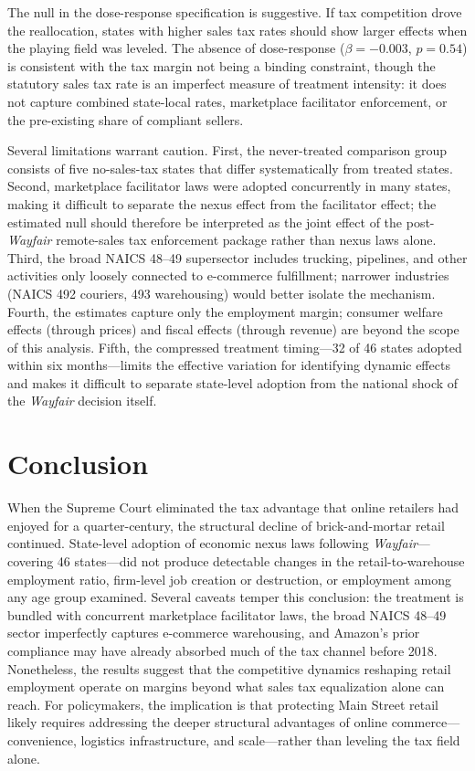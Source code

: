 \documentclass[12pt]{article}
\begin{document}
The null in the dose-response specification is suggestive. If tax competition drove the reallocation, states with higher sales tax rates should show larger effects when the playing field was leveled. The absence of dose-response ($\beta = -0.003$, $p = 0.54$) is consistent with the tax margin not being a binding constraint, though the statutory sales tax rate is an imperfect measure of treatment intensity: it does not capture combined state-local rates, marketplace facilitator enforcement, or the pre-existing share of compliant sellers.

Several limitations warrant caution. First, the never-treated comparison group consists of five no-sales-tax states that differ systematically from treated states. Second, marketplace facilitator laws were adopted concurrently in many states, making it difficult to separate the nexus effect from the facilitator effect; the estimated null should therefore be interpreted as the joint effect of the post-\textit{Wayfair} remote-sales tax enforcement package rather than nexus laws alone. Third, the broad NAICS 48--49 supersector includes trucking, pipelines, and other activities only loosely connected to e-commerce fulfillment; narrower industries (NAICS 492 couriers, 493 warehousing) would better isolate the mechanism. Fourth, the estimates capture only the employment margin; consumer welfare effects (through prices) and fiscal effects (through revenue) are beyond the scope of this analysis. Fifth, the compressed treatment timing---32 of 46 states adopted within six months---limits the effective variation for identifying dynamic effects and makes it difficult to separate state-level adoption from the national shock of the \textit{Wayfair} decision itself.


\section{Conclusion}

When the Supreme Court eliminated the tax advantage that online retailers had enjoyed for a quarter-century, the structural decline of brick-and-mortar retail continued. State-level adoption of economic nexus laws following \textit{Wayfair}---covering 46 states---did not produce detectable changes in the retail-to-warehouse employment ratio, firm-level job creation or destruction, or employment among any age group examined. Several caveats temper this conclusion: the treatment is bundled with concurrent marketplace facilitator laws, the broad NAICS 48--49 sector imperfectly captures e-commerce warehousing, and Amazon's prior compliance may have already absorbed much of the tax channel before 2018. Nonetheless, the results suggest that the competitive dynamics reshaping retail employment operate on margins beyond what sales tax equalization alone can reach. For policymakers, the implication is that protecting Main Street retail likely requires addressing the deeper structural advantages of online commerce---convenience, logistics infrastructure, and scale---rather than leveling the tax field alone.
\end{document}
